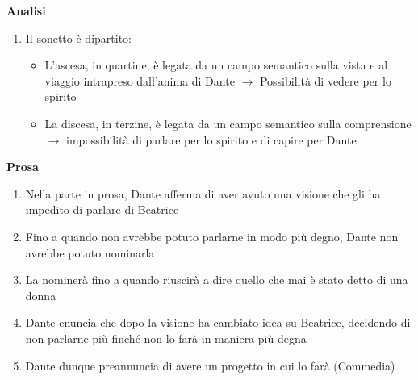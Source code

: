 \documentclass{article}
\begin{document}
\textbf{Analisi}
\begin{enumerate}
    \item Il sonetto è dipartito:
        \begin{itemize}
            \item L'ascesa, in quartine, è legata da un campo semantico sulla vista e al viaggio
                intrapreso dall'anima di Dante $\rightarrow$ Possibilità di vedere per lo spirito
            \item La discesa, in terzine, è legata da un campo semantico sulla comprensione
                $\rightarrow$ impossibilità di parlare per lo spirito e di capire per Dante
        \end{itemize}
\end{enumerate}

\textbf{Prosa}
\begin{enumerate}
    \item Nella parte in prosa, Dante afferma di aver avuto una visione che gli ha impedito di
        parlare di Beatrice
    \item Fino a quando non avrebbe potuto parlarne in modo più degno, Dante non avrebbe potuto
        nominarla
    \item La nominerà fino a quando riuscirà a dire quello che mai è stato detto di una donna
    \item Dante enuncia che dopo la visione ha cambiato idea su Beatrice, decidendo di non
        parlarne più finché non lo farà in maniera più degna
    \item Dante dunque preannuncia di avere un progetto in cui lo farà (Commedia)
\end{enumerate}

\newpage
\end{document}
